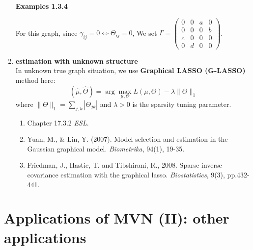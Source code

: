 \documentclass[12pt]{book}
\theoremstyle{definition}
\theoremstyle{remark}
\begin{document}
\begin{enumerate}
\textbf{Examples 1.3.4}\\
\begin{center}
\end{center}
For this graph, since $\gamma_{ij} = 0\Leftrightarrow\Theta_{ij} = 0$, We set $\Gamma = \begin{pmatrix}
0  & 0 &  a& 0\\
 0 & 0 & 0 & b\\
 c & 0 & 0 & 0\\
 0 & d & 0 &0
\end{pmatrix}$.

\item \textbf{estimation with unknown structure}\\
In unknown true graph situation, we use \textbf{Graphical LASSO (G-LASSO)} method here:
\[(\hat{\mu}, \hat{\Theta}) = \arg\underset{\mu,\Theta}{\max}L(\mu, \Theta) - \lambda \|\Theta\|_1\]
where $\|\Theta\|_1 = \sum_{j,k}|\Theta_{jk}|$ and $\lambda>0$ is the sparsity tuning parameter.\\

\begin{referencebox}
\begin{enumerate}
    \item Chapter 17.3.2 \textit{ESL}.
    \item Yuan, M., \& Lin, Y. (2007). Model selection and estimation in the Gaussian graphical model. \textit{Biometrika}, 94(1), 19-35.
    \item Friedman, J., Hastie, T. and Tibshirani, R., 2008. Sparse inverse covariance estimation with the graphical lasso. \textit{Biostatistics}, 9(3), pp.432-441.
\end{enumerate}
\end{referencebox}
\end{enumerate}

\newpage
\section{Applications of MVN (II): other applications}
\end{document}
